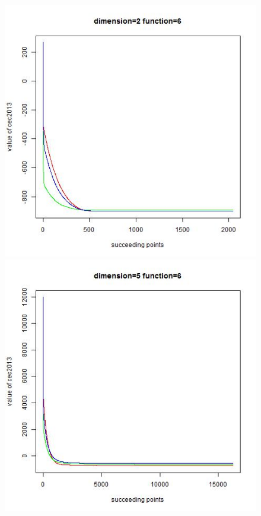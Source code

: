 \documentclass{article}
\begin{document}
\begin{figure}[!htb]
\centering
{}
  \includegraphics[width=\linewidth]{dim_2__func_6}
\endminipage\hfill
{}
  \includegraphics[width=\linewidth]{dim_5__func_6}

\end{figure}
\end{document}
